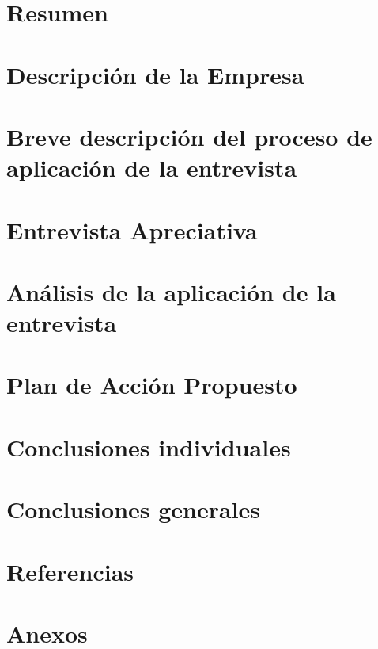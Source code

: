 \documentclass[letter, 10pt]{article}
\begin{document}




\tableofcontents

\newpage
\section{Resumen}


\section{Descripción de la Empresa}


\section{Breve descripción del proceso de aplicación de la entrevista}


\section{Entrevista Apreciativa}


\section{Análisis de la aplicación de la entrevista}


\section{Plan de Acción Propuesto}

\newpage

\section{Conclusiones individuales}

\newpage

\section{Conclusiones generales}

\newpage

\section{Referencias}

\newpage

\section{Anexos}

\end{document}
